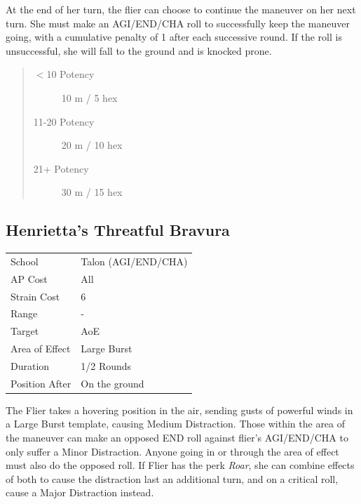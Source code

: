 \documentclass[11pt,a4paper,twocolumn]{book}
\begin{document}
At the end of her turn, the flier can choose to continue the maneuver on her next turn. She must make an AGI/END/CHA roll to successfully keep the maneuver going, with a cumulative penalty of 1 after each successive round. If the roll is unsuccessful, she will fall to the ground and is knocked prone.

\begin{quote}
	\begin{description}
		\item[$<$10 Potency] 	10 m / 5 hex
		\item[11-20 Potency] 	20 m / 10 hex
		\item[21+ Potency] 	30 m / 15 hex
	\end{description}
\end{quote}

\vfill

\subsection*{Henrietta's Threatful Bravura}
{
	\begin{tabu} to 75mm{| X[l,4] | X[l,7] |}
		\hline
		School 			& Talon (AGI/END/CHA)			\\
        AP Cost	      	& All				\\
        Strain Cost     & 6 				\\
        Range     		& - 				\\
        Target      	& AoE 				\\
        Area of Effect  & Large Burst 	 	\\
        Duration     	& 1/2 Rounds	 			\\
		Position After  & On the ground 	\\ \hline
	\end{tabu}
		
}

\medskip

The Flier takes a hovering position in the air, sending gusts of powerful winds in a Large Burst template, causing Medium Distraction. Those within the area of the maneuver can make an opposed END roll against flier's AGI/END/CHA to only suffer a Minor Distraction. Anyone going in or through the area of effect must also do the opposed roll. If Flier has the perk \textit{Roar}, she can combine effects of both to cause the distraction last an additional turn, and on a critical roll, cause a Major Distraction instead. 
\end{document}
